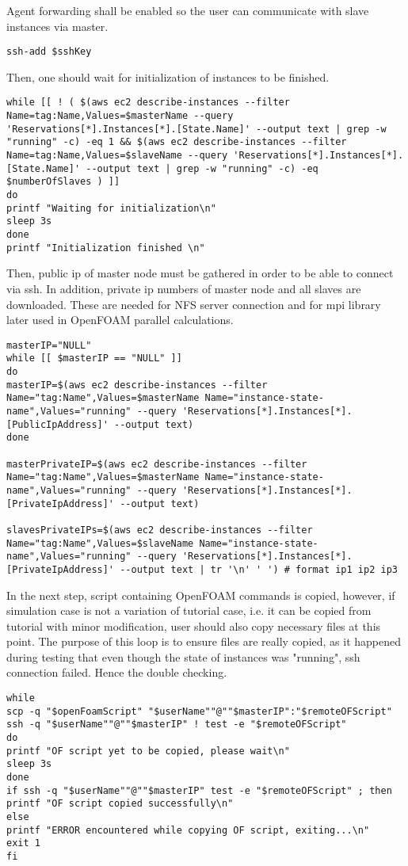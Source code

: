 \documentclass[11pt,english]{article}
\begin{document}
Agent forwarding shall be enabled so the user can communicate with slave instances via master.
\begin{lstlisting}
ssh-add $sshKey
\end{lstlisting}
Then, one should wait for initialization of instances to be finished.
\begin{lstlisting}
while [[ ! ( $(aws ec2 describe-instances --filter Name=tag:Name,Values=$masterName --query 'Reservations[*].Instances[*].[State.Name]' --output text | grep -w "running" -c) -eq 1 && $(aws ec2 describe-instances --filter Name=tag:Name,Values=$slaveName --query 'Reservations[*].Instances[*].[State.Name]' --output text | grep -w "running" -c) -eq $numberOfSlaves ) ]] 
do
printf "Waiting for initialization\n"
sleep 3s
done
printf "Initialization finished \n"
\end{lstlisting}
Then, public ip of master node must be gathered in order to be able to connect via ssh. In addition, private ip numbers of master node and all slaves are downloaded. These are needed for NFS server connection and for mpi library later used in OpenFOAM parallel calculations.
\begin{lstlisting}
masterIP="NULL"
while [[ $masterIP == "NULL" ]]
do
masterIP=$(aws ec2 describe-instances --filter Name="tag:Name",Values=$masterName Name="instance-state-name",Values="running" --query 'Reservations[*].Instances[*].[PublicIpAddress]' --output text)
done

masterPrivateIP=$(aws ec2 describe-instances --filter Name="tag:Name",Values=$masterName Name="instance-state-name",Values="running" --query 'Reservations[*].Instances[*].[PrivateIpAddress]' --output text)

slavesPrivateIPs=$(aws ec2 describe-instances --filter Name="tag:Name",Values=$slaveName Name="instance-state-name",Values="running" --query 'Reservations[*].Instances[*].[PrivateIpAddress]' --output text | tr '\n' ' ') # format ip1 ip2 ip3
\end{lstlisting}
In the next step, script containing OpenFOAM commands is copied, however, if simulation case is not a variation of tutorial case, i.e. it can be copied from tutorial with minor modification, user should also copy necessary files at this point. The purpose of this loop is to ensure files are really copied, as it happened during testing that even though the state of instances was "running", ssh connection failed. Hence the double checking.
\begin{lstlisting}
while 
scp -q "$openFoamScript" "$userName""@""$masterIP":"$remoteOFScript"
ssh -q "$userName""@""$masterIP" ! test -e "$remoteOFScript"
do 
printf "OF script yet to be copied, please wait\n"
sleep 3s
done
if ssh -q "$userName""@""$masterIP" test -e "$remoteOFScript" ; then
printf "OF script copied successfully\n"
else   
printf "ERROR encountered while copying OF script, exiting...\n"
exit 1
fi
\end{lstlisting}
\end{document}
